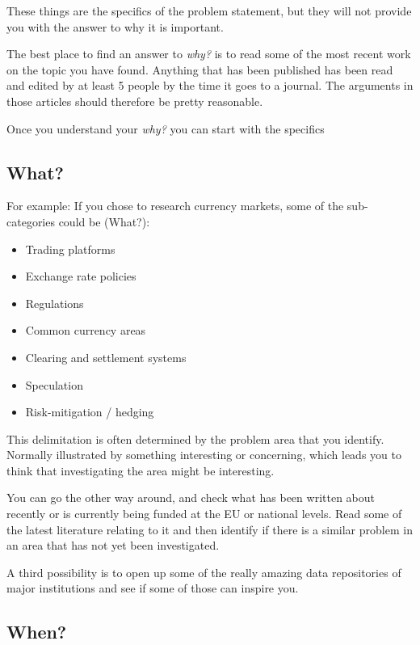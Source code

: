 \documentclass[
]{book}
\begin{document}
These things are the specifics of the problem statement, but they will
not provide you with the answer to why it is important.

The best place to find an answer to \emph{why?} is to read some of the most
recent work on the topic you have found. Anything that has been
published has been read and edited by at least 5 people by the time it
goes to a journal. The arguments in those articles should therefore be
pretty reasonable.

Once you understand your \emph{why?} you can start with the specifics

\hypertarget{what}{%
\subsection{What?}\label{what}}

For example: If you chose to research currency markets, some of the
sub-categories could be (What?):

\begin{itemize}
\item
  Trading platforms
\item
  Exchange rate policies
\item
  Regulations
\item
  Common currency areas
\item
  Clearing and settlement systems
\item
  Speculation
\item
  Risk-mitigation / hedging
\end{itemize}

This delimitation is often determined by the problem area that you
identify. Normally illustrated by something interesting or concerning,
which leads you to think that investigating the area might be
interesting.

You can go the other way around, and check what has been written about recently or is
currently being funded at the EU or national levels. Read some of the
latest literature relating to it and then identify if there is a similar
problem in an area that has not yet been investigated.

A third possibility is to open up some of the really amazing data
repositories of major institutions and see if some of those can inspire
you.

\hypertarget{when}{%
\subsection{When?}\label{when}}
\end{document}
